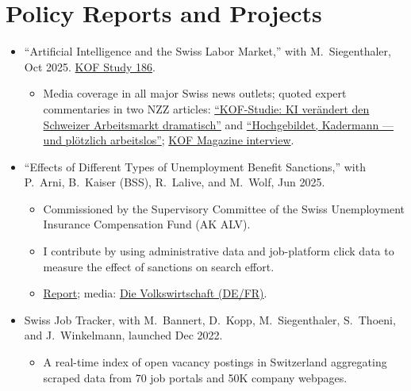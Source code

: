 \documentclass[11pt]{article}
\begin{document}
\section{Policy Reports and Projects}
\begin{itemize}
\item ``Artificial Intelligence and the Swiss Labor Market,'' with M.~Siegenthaler, Oct 2025. \href{https://kof.ethz.ch/content/dam/ethz/special-interest/dual/kof-dam/documents/newsletter/KOF_Studie_KI_Schweizer_Arbeitsmarkt.pdf}{KOF Study 186}.
  \begin{itemize}[label=--]
  \item Media coverage in all major Swiss news outlets; quoted expert commentaries in two NZZ articles: \href{https://www.nzz.ch/wirtschaft/kof-studie-ki-veraendert-den-schweizer-arbeitsmarkt-dramatisch-ld.1905520}{``KOF-Studie: KI ver\"andert den Schweizer Arbeitsmarkt dramatisch''} and \href{https://www.nzz.ch/zuerich/hochgebildet-kadermann-und-ploetzlich-arbeitslos-ein-gefallener-ki-manager-erzaehlt-ld.1910405}{``Hochgebildet, Kadermann --- und pl\"otzlich arbeitslos''}; \href{https://kof.ethz.ch/en/publications/kof-insights/articles/2025/12/i-expect-ai-to-make-us-all-richer.html}{KOF Magazine interview}.
  \end{itemize}
\item ``Effects of Different Types of Unemployment Benefit Sanctions,'' with P.~Arni, B.~Kaiser (BSS), R.~Lalive, and M.~Wolf, Jun 2025.
  \begin{itemize}[label=--]
  \item Commissioned by the Supervisory Committee of the Swiss Unemployment Insurance Compensation Fund (AK ALV).
  \item I contribute by using administrative data and job-platform click data to measure the effect of sanctions on search effort.
  \item \href{https://www.seco.admin.ch/seco/en/home/Publikationen_Dienstleistungen/Publikationen_und_Formulare/Arbeit/Arbeitsmarkt/Informationen_Arbeitsmarktforschung/wirkung_unterschiedlicher_sanktionen_arbeitslosenversicherung.html}{Report}; media: \href{https://dievolkswirtschaft.ch/de/2025/06/was-bewirken-sanktionen-in-der-arbeitslosenversicherung/}{Die Volkswirtschaft (DE/FR)}.
  \end{itemize}
\item Swiss Job Tracker, with M.~Bannert, D.~Kopp, M.~Siegenthaler, S.~Thoeni, and J.~Winkelmann, launched Dec 2022.
  \begin{itemize}[label=--]
  \item A real-time index of open vacancy postings in Switzerland aggregating scraped data from 70 job portals and 50K company webpages.

\end{itemize}
\end{itemize}
\end{document}
